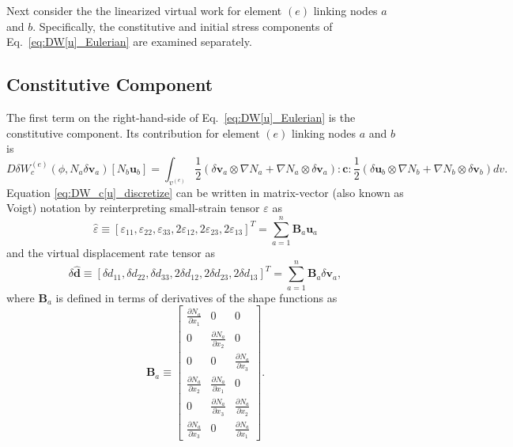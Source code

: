 \documentclass[12pt,aps,pre]{revtex4}
\begin{document}
Next consider the the linearized virtual work for element $(e)$ linking nodes $a$ and $b$. Specifically, the constitutive and initial stress components of Eq.\ \eqref{eq:DW[u]_Eulerian} are examined separately.

\subsection{Constitutive Component}

The first term on the right-hand-side of Eq.\ \eqref{eq:DW[u]_Eulerian} is the constitutive component. Its contribution for element $(e)$ linking nodes $a$ and $b$ is
%
\begin{equation}
D\delta W_c^{(e)}(\phi,N_a\delta \pmb{v}_a)[N_b\pmb{u}_b] = \int_{v^{(e)}} \frac{1}{2} \left(\delta \pmb{v}_a \otimes \nabla N_a + \nabla N_a \otimes \delta \pmb{v}_a\right):\pmb{c}:\frac{1}{2} \left(\delta \pmb{u}_b \otimes \nabla N_b + \nabla N_b \otimes \delta \pmb{v}_b\right)dv.
\label{eq:DW_c[u]_discretize}
\end{equation}
%
Equation \eqref{eq:DW_c[u]_discretize} can be written in matrix-vector (also known as Voigt) notation by reinterpreting small-strain tensor $\varepsilon$ as
%
\begin{equation}
\hat{\varepsilon} \equiv [\varepsilon_{11}, \varepsilon_{22}, \varepsilon_{33}, 2\varepsilon_{12}, 2\varepsilon_{23}, 2\varepsilon_{13}]^T = \sum_{a=1}^n \pmb{B}_a \pmb{u}_a
\label{eq:strain_Voigt}
\end{equation}
%
and the virtual displacement rate tensor as
%
\begin{equation}
\delta\hat{\pmb{d}} \equiv [\delta d_{11}, \delta d_{22}, \delta d_{33}, 2\delta d_{12}, 2\delta d_{23}, 2\delta d_{13}]^T = \sum_{a=1}^n \pmb{B}_a \delta \pmb{v}_a,
\label{eq:virtual_displacement_Voigt}
\end{equation}
%
where $\pmb{B}_a$ is defined in terms of derivatives of the shape functions as
%
\begin{equation}
\pmb{B}_a \equiv
\begin{bmatrix}
\frac{\partial N_a}{\partial x_1} & 0 & 0  \\
0 & \frac{\partial N_a}{\partial x_2} & 0 \\
0 & 0 & \frac{\partial N_a}{\partial x_3} \\
\frac{\partial N_a}{\partial x_2} & \frac{\partial N_a}{\partial x_1} & 0  \\ 
0 & \frac{\partial N_a}{\partial x_3} & \frac{\partial N_a}{\partial x_2}  \\
\frac{\partial N_a}{\partial x_3} & 0 & \frac{\partial N_a}{\partial x_1} 
\end{bmatrix}.
\end{equation}
\end{document}
